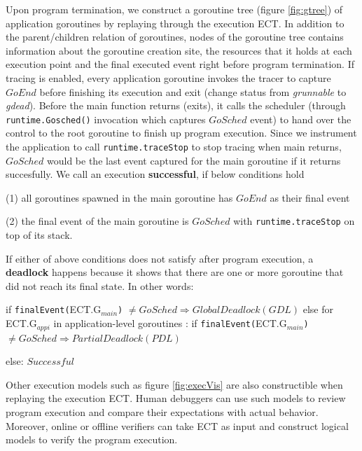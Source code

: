 Upon program termination, we construct a goroutine tree (figure \ref{fig:gtree}) of application goroutines by replaying through the execution ECT.
%
In addition to the parent/children relation of goroutines, nodes of the goroutine tree contains information about the goroutine creation site, the resources that it holds at each execution point and the final executed event right before program termination.
%
If tracing is enabled, every application goroutine invokes the tracer to capture $GoEnd$ before finishing its execution and exit (change status from \textit{grunnable} to \textit{gdead})\cite{goexit-line-of-code}.
%
Before the main function returns (\ie exits), it calls the scheduler (through \texttt{runtime.Gosched()} invocation which captures $GoSched$ event) to hand over the control to the root goroutine to finish up program execution.
%
Since we instrument the application to call \texttt{runtime.traceStop} to stop tracing when main returns, $GoSched$ would be the last event captured for the main goroutine if it returns succesfully.
%
We call an execution \textbf{successful}, if below conditions hold
\begin{description}
  \item (1) all goroutines spawned in the main goroutine has $GoEnd$ as their final event
  \item (2) the final event of the main goroutine is $GoSched$ with \texttt{runtime.traceStop} on top of its stack.
\end{description}


If either of above conditions does not satisfy after program execution, a \textbf{deadlock} happens because it shows that there are one or more goroutine that did not reach its final state. In other words:

if \texttt{finalEvent(}ECT.G$_{main}$\texttt{)} $\neq GoSched \Rightarrow Global Deadlock (GDL)$
else
  for ECT.G$_{appi}$ in application-level goroutines  :
    if \texttt{finalEvent(}ECT.G$_{main}$\texttt{)} $\neq GoSched \Rightarrow Partial Deadlock (PDL)$

    else:
    $Successful$

%
Other execution models such as figure \ref{fig:execVis} are also constructible when replaying the execution ECT.
%
Human debuggers can use such models to review program execution and compare their expectations with actual behavior.
%
Moreover, online or offline verifiers can take ECT as input and construct logical models to verify the program execution.
%


